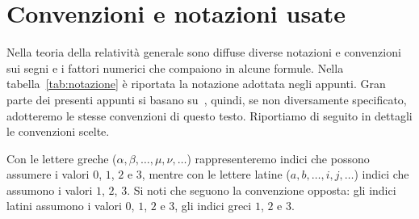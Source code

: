 \cleardoublepage
\chapter{Convenzioni e notazioni usate}
\label{cha:notazioni}

Nella teoria della relatività generale sono diffuse diverse notazioni e
convenzioni sui segni e i fattori numerici che compaiono in alcune formule.
Nella tabella~\ref{tab:notazione} è riportata la notazione adottata negli
appunti.  Gran parte dei presenti appunti si basano
su~\textcite{weinberg:gravitation}, quindi, se non diversamente specificato,
adotteremo le stesse convenzioni di questo testo.  Riportiamo di seguito in
dettagli le convenzioni scelte.

Con le lettere greche ($\alpha,\beta,\dots,\mu,\nu,\dots$) rappresenteremo
indici che possono assumere i valori $0$, $1$, $2$ e $3$, mentre con le lettere
latine ($a,b,\dots,i,j,\dots$) indici che assumono i valori $1$, $2$, $3$.  Si
noti che \textcite{landau:campi} seguono la convenzione opposta: gli indici
latini assumono i valori $0$, $1$, $2$ e $3$, gli indici greci $1$, $2$ e $3$.

